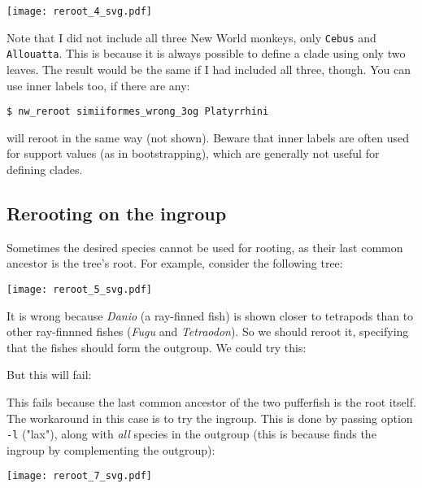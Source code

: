 

\begin{center}
\texttt{[image: reroot\_4\_svg.pdf]}
\end{center}

\noindent{}Note that I did not include all three New World monkeys, only \texttt{Cebus} and \texttt{Allouatta}. This is because it is always possible to define a clade using only two leaves. The result would be the same if I had included all three, though. You can use inner labels too, if there are any:
\begin{verbatim}
$ nw_reroot simiiformes_wrong_3og Platyrrhini
\end{verbatim}
will reroot in the same way (not shown). Beware that inner labels are often
used for support values (as in bootstrapping), which are generally not useful
for defining clades.

\subsection{Rerooting on the ingroup}

Sometimes the desired species cannot be used for rooting, as their last common ancestor is the tree's root. For example, consider the following tree:

\begin{center}
\texttt{[image: reroot\_5\_svg.pdf]}
\end{center}

\noindent{}It is wrong because \textit{Danio} (a ray-finned fish) is shown
closer to tetrapods than to other ray-finnned fishes (\textit{Fugu} and
\textit{Tetraodon}). So we should reroot it, specifying that the fishes should
form the outgroup. We could try this:



\noindent{}But this will fail:



\noindent{}This fails because the last common ancestor of the two pufferfish is
the root itself. The workaround in this case is to try the ingroup. This is
done by passing option \texttt{-l} ("lax"), along with \emph{all} species in
the outgroup (this is because \reroot{} finds the ingroup by complementing the
outgroup):


\begin{center}
\texttt{[image: reroot\_7\_svg.pdf]}
\end{center}

